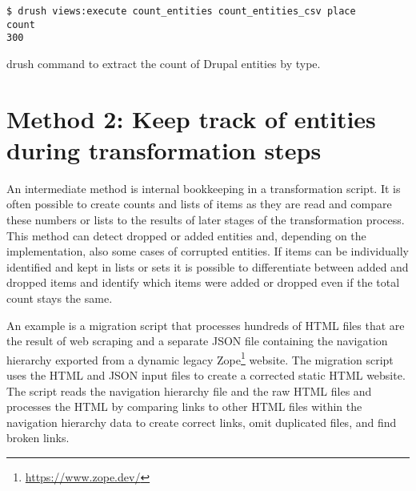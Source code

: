 \documentclass[final]{anthology-ch} %
\begin{document}
\begin{listing}
\begin{verbatim}
$ drush views:execute count_entities count_entities_csv place
count
300
\end{verbatim}
 \caption{drush command to extract the count of Drupal entities by type.}
\label{code:ismi-cnt}
\end{listing}

\section{Method 2: Keep track of entities during transformation steps}

An intermediate method is internal bookkeeping in a transformation script. It is often possible to create counts and lists of items as they are read and compare these numbers or lists to the results of later stages of the transformation process. This method can detect dropped or added entities and, depending on the implementation, also some cases of corrupted entities. If items can be individually identified and kept in lists or sets it is possible to differentiate between added and dropped items and identify which items were added or dropped even if the total count stays the same.

An example is a migration script that processes hundreds of HTML files that are the result of web scraping and a separate JSON file containing the navigation hierarchy exported from a dynamic legacy Zope\footnote{\url{https://www.zope.dev/}} website. The migration script uses the HTML and JSON input files to create a corrected static HTML website. The script reads the navigation hierarchy file and the raw HTML files and processes the HTML by comparing links to other HTML files within the navigation hierarchy data to create correct links, omit duplicated files, and find broken links.
\end{document}
